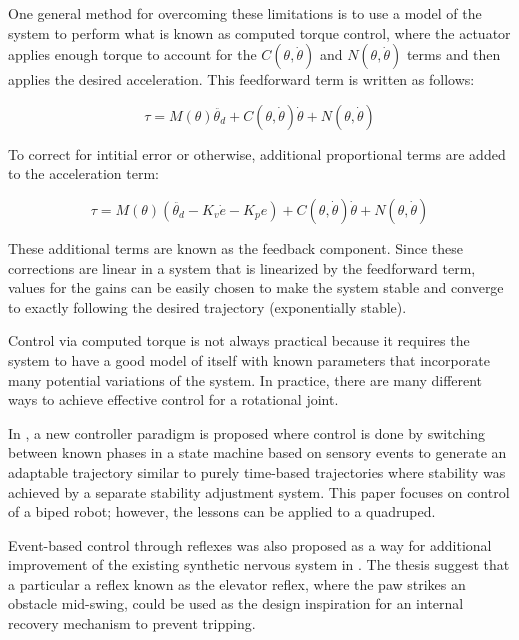 One general method for overcoming these limitations is to use a model of the 
system to perform what is known as computed torque control, where the actuator
applies enough torque to account for the $C(\theta, \dot{\theta})$ and
$N(\theta, \dot{\theta})$ terms and then applies the desired acceleration. This feedforward term is written as follows:

\begin{equation}
\tau = M(\theta) \ddot{\theta_{d}} + C(\theta, \dot{\theta}) \dot{\theta} + N(\theta, \dot{\theta})
\end{equation}

To correct for intitial error or otherwise, additional proportional terms are
added to the acceleration term:

\begin{equation}
\tau = M(\theta) (\ddot{\theta_{d}} - K_{v} \dot{e} - K_{p} e) + C(\theta, \dot{\theta}) \dot{\theta} + N(\theta, \dot{\theta})
\end{equation}

These additional terms are known as the feedback component. Since these 
corrections are linear in a system that is linearized by the feedforward term,
values for the gains can be easily chosen to make the system stable and converge
to exactly following the desired trajectory (exponentially stable). \cite{MLS94}

Control via computed torque 
is not always practical because it requires the system to have a good model of 
itself with known parameters that incorporate many potential variations of the
system. In practice, 
there are many different ways to achieve effective control for a rotational 
joint.


In \cite{EventBasedWalking}, a new controller paradigm is proposed where control
is done by switching between known phases in a state machine based on sensory
events to generate an adaptable trajectory similar to purely time-based
trajectories where stability was achieved by a separate stability adjustment
system. This paper focuses on control of a biped robot; however, the lessons can
be applied to a quadruped.

Event-based control through reflexes was also proposed as a way for additional
improvement of the existing synthetic nervous system in \cite{HuntPhDThesis}.
The thesis suggest that a particular a reflex known as the elevator reflex,
where the paw strikes an
obstacle mid-swing, could be used as the design inspiration for an internal recovery
mechanism to prevent tripping.

